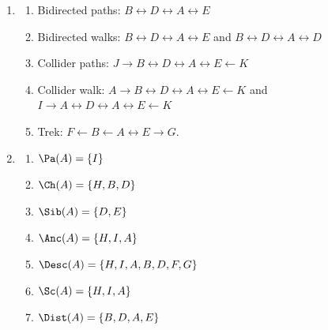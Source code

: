 \begin{enumerate}
\begin{gradedsolution}
  \begin{enumerate}
    \item
    \begin{enumerate}
      \item Bidirected paths: $B\leftrightarrow D \leftrightarrow A \leftrightarrow E$
      \item Bidirected walks: $B\leftrightarrow D \leftrightarrow A \leftrightarrow E$ and $B\leftrightarrow D \leftrightarrow A \leftrightarrow D$
      \item Collider paths: $J \rightarrow B \leftrightarrow D \leftrightarrow A \leftrightarrow E \leftarrow K$
      \item Collider walk: $A \rightarrow B\leftrightarrow D \leftrightarrow A \leftrightarrow E \leftarrow K$ and $I \rightarrow A \leftrightarrow D \leftrightarrow A \leftrightarrow E \leftarrow K$
      \item Trek: $F\leftarrow B\leftarrow A \leftrightarrow E \rightarrow G$.
    \end{enumerate}
    \item
    \begin{enumerate}
      \item $\Pa(A) = \{I\}$
      \item $\Ch(A) = \{H, B, D\}$
      \item $\Sib(A) = \{D, E\}$
      \item $\Anc(A) = \{H, I, A\}$
      \item $\Desc(A) = \{H, I, A, B, D, F, G\}$
      \item $\Sc(A) = \{H, I, A\}$
      \item $\Dist(A) = \{B, D, A, E\}$
    \end{enumerate}
  \end{enumerate}
\end{gradedsolution}


\end{enumerate}
